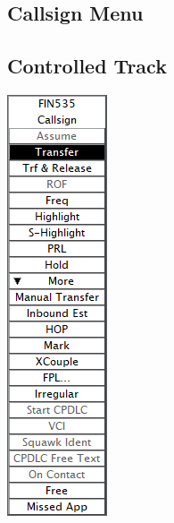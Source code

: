 \documentclass[11pt,a4paper]{memoir}
\begin{document}
\subsection{Callsign Menu}
\label{menu:cs}
\subsection*{Controlled Track}
\includegraphics{img/cm.png}
\end{document}

